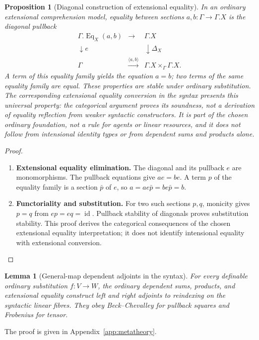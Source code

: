 \documentclass[11pt,a4paper]{article}
\numberwithin{equation}{section}
\newtheorem{proposition}[theorem]{Proposition}
\newtheorem{lemma}[theorem]{Lemma}
\theoremstyle{definition}
\theoremstyle{remark}
\theoremstyle{plain}
\providecommand{\id}{\mathop{\mathrm{id}}}
\begin{document}
\begin{proposition}[Diagonal construction of extensional equality]
\label{agt-prop-equality-diagonal}
In an ordinary extensional comprehension model, equality between
sections $a,b:\Gamma\to\Gamma.X$ is the diagonal pullback
\[
\begin{array}{ccc}
 \Gamma.\operatorname{Eq}_X(a,b)&\longrightarrow&\Gamma.X\\
 \downarrow e&&\downarrow\Delta_X\\
 \Gamma&\xrightarrow{\langle a,b\rangle}&
 \Gamma.X\times_\Gamma\Gamma.X.
\end{array}
\]
A term of this equality family yields the equation $a=b$; two terms
of the same equality family are equal. These properties are stable
under ordinary substitution. The corresponding extensional equality conversion in the syntax
\emph{presents} this universal property: the categorical argument proves
its soundness, not a derivation of equality reflection from weaker
syntactic constructors.  It is part of the chosen \emph{ordinary}
foundation, not a rule for agents or linear resources, and it does not
follow from intensional identity types or from dependent sums and
products alone.
\end{proposition}
\begin{proof}
\leavevmode
\begin{enumerate}[label=\textup{(\arabic*)},leftmargin=*,itemsep=4pt,topsep=3pt]
  \item \textbf{Extensional equality elimination.} The diagonal and its pullback $e$ are monomorphisms. The pullback
equations give $ae=be$. A term $p$ of the equality family is a
section $\bar p$ of $e$, so
$a=ae\bar p=be\bar p=b$.
  \item \textbf{Functoriality and substitution.} For two such sections $p,q$, monicity gives $p=q$ from
$ep=eq=\id$. Pullback stability of diagonals proves substitution
stability. This proof derives the categorical consequences of the
chosen extensional equality interpretation; it does not identify
intensional equality with extensional conversion.
\end{enumerate}
\end{proof}

\begin{lemma}[General-map dependent adjoints in the syntax]
\label{agt-lem-general-syntactic-adjoints}
For every definable ordinary substitution $f:V\to W$, the ordinary
dependent sums, products, and extensional equality construct left and
right adjoints to reindexing on the syntactic linear fibres.  They obey
Beck--Chevalley for pullback squares and Frobenius for tensor.
\end{lemma}
\par\noindent The proof is given in Appendix~\ref{app:metatheory}.
\end{document}
